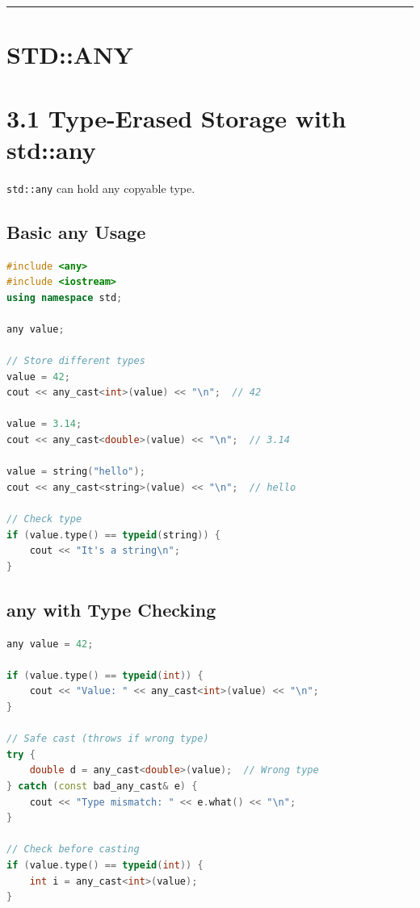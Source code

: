 \begin{center}\rule{0.5\linewidth}{0.5pt}\end{center}

\hypertarget{stdany}{%
\section{STD::ANY}\label{stdany}}

\hypertarget{type-erased-storage-with-stdany}{%
\section{3.1 Type-Erased Storage with
std::any}\label{type-erased-storage-with-stdany}}

\passthrough{\lstinline!std::any!} can hold any copyable type.

\hypertarget{basic-any-usage}{%
\subsection{Basic any Usage}\label{basic-any-usage}}

\begin{lstlisting}[language={C++}]
#include <any>
#include <iostream>
using namespace std;

any value;

// Store different types
value = 42;
cout << any_cast<int>(value) << "\n";  // 42

value = 3.14;
cout << any_cast<double>(value) << "\n";  // 3.14

value = string("hello");
cout << any_cast<string>(value) << "\n";  // hello

// Check type
if (value.type() == typeid(string)) {
    cout << "It's a string\n";
}
\end{lstlisting}

\hypertarget{any-with-type-checking}{%
\subsection{any with Type Checking}\label{any-with-type-checking}}

\begin{lstlisting}[language={C++}]
any value = 42;

if (value.type() == typeid(int)) {
    cout << "Value: " << any_cast<int>(value) << "\n";
}

// Safe cast (throws if wrong type)
try {
    double d = any_cast<double>(value);  // Wrong type
} catch (const bad_any_cast& e) {
    cout << "Type mismatch: " << e.what() << "\n";
}

// Check before casting
if (value.type() == typeid(int)) {
    int i = any_cast<int>(value);
}
\end{lstlisting}

